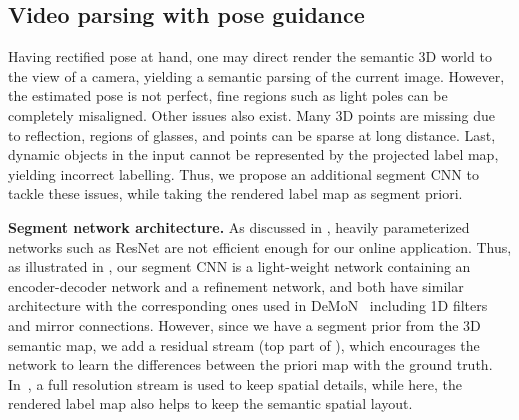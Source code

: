 \subsection{Video parsing with pose guidance}
\label{subsec:parsing}
Having rectified pose at hand, one may direct render the semantic 3D world to the view of a camera, yielding a semantic parsing of the current image. However, the estimated pose is not perfect, fine regions such as light poles can be completely misaligned. Other issues also exist. Many 3D points are missing due to reflection, \eg regions of glasses, and points can be sparse at long distance. Last, dynamic objects in the input cannot be represented by the projected label map, yielding incorrect labelling. Thus, we propose an additional segment CNN to tackle these issues, while taking the rendered label map as segment priori.

\textbf{Segment network architecture.} As discussed in , heavily parameterized networks such as ResNet are not efficient enough for our online application. Thus, as illustrated in , our segment CNN is a light-weight network containing an encoder-decoder network and a refinement network, and both have similar architecture with the corresponding ones used in DeMoN~\cite{ummenhofer2016demon} including 1D filters and mirror connections. However, since we have a segment prior from the 3D semantic map, we add a residual stream (top part of ), which encourages the network to learn the differences between the priori map with the ground truth. In~\cite{pohlen2016full}, a full resolution stream is used to keep spatial details, while here, the rendered label map also helps to keep the semantic spatial layout.

